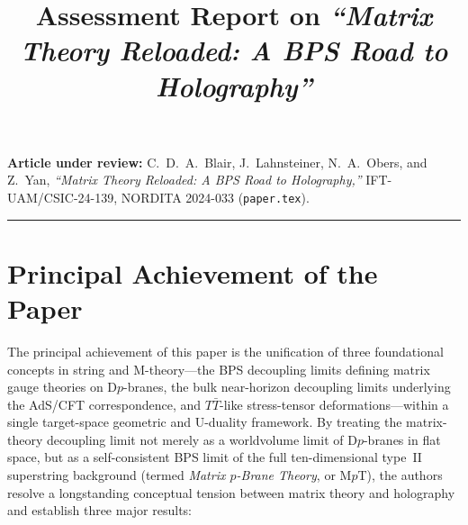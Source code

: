 \documentclass[11pt,a4paper]{article}
\title{\textbf{Assessment Report on \emph{``Matrix Theory Reloaded: A BPS Road to Holography''}}}
\author{}
\date{}
\begin{document}
\maketitle
\vspace{-2.5em}

\noindent
\textbf{Article under review:} C.~D.~A.~Blair, J.~Lahnsteiner, N.~A.~Obers, and Z.~Yan, \emph{``Matrix Theory Reloaded: A BPS Road to Holography,''} IFT-UAM/CSIC-24-139, NORDITA 2024-033 (\texttt{paper.tex}).

\medskip
\hrule
\bigskip

\section{Principal Achievement of the Paper}

The principal achievement of this paper is the unification of three foundational concepts in string and M-theory---the BPS decoupling limits defining matrix gauge theories on D$p$-branes, the bulk near-horizon decoupling limits underlying the AdS/CFT correspondence, and $T\bar{T}$-like stress-tensor deformations---within a single target-space geometric and U-duality framework. By treating the matrix-theory decoupling limit not merely as a worldvolume limit of D$p$-branes in flat space, but as a self-consistent BPS limit of the full ten-dimensional type~II superstring background (termed \emph{Matrix $p$-Brane Theory}, or M$p$T), the authors resolve a longstanding conceptual tension between matrix theory and holography and establish three major results:
\end{document}
